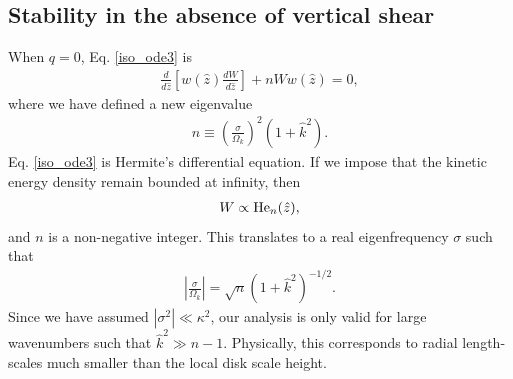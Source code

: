 \subsection{Stability in the absence of vertical shear}
When $q=0$, Eq. \ref{iso_ode3} is
\begin{align}\label{hermite_ode}
  \frac{d}{d\hat{z}}\left[w(\hat{z})\frac{dW}{d\hat{z}}\right] + nW
  w(\hat{z}) =0, 
\end{align}
where we have defined a new eigenvalue
\begin{align}
  n \equiv \left(\frac{\sigma}{\Omega_k}\right)^2(1+\hat{k}^2). 
\end{align} 
Eq. \ref{iso_ode3} is Hermite's differential equation. If we impose
that the kinetic energy density remain bounded at infinity, then  
\begin{align}
  W \propto \operatorname{He}_n(\hat{z}),
\end{align}
and $n$ is a non-negative integer. This translates to a real
eigenfrequency $\sigma$ such that
\begin{align}
  \left|\frac{\sigma}{\Omega_k}\right| = \sqrt{n}
  \left(1+\hat{k}^2\right)^{-1/2}. 
\end{align}
Since we have assumed $|\sigma^2|\ll \kappa^2$, our analysis is only
valid for large wavenumbers such that $\hat{k}^2\gg 
n-1$. Physically, this corresponds to radial length-scales much
smaller than the local disk scale height. 


